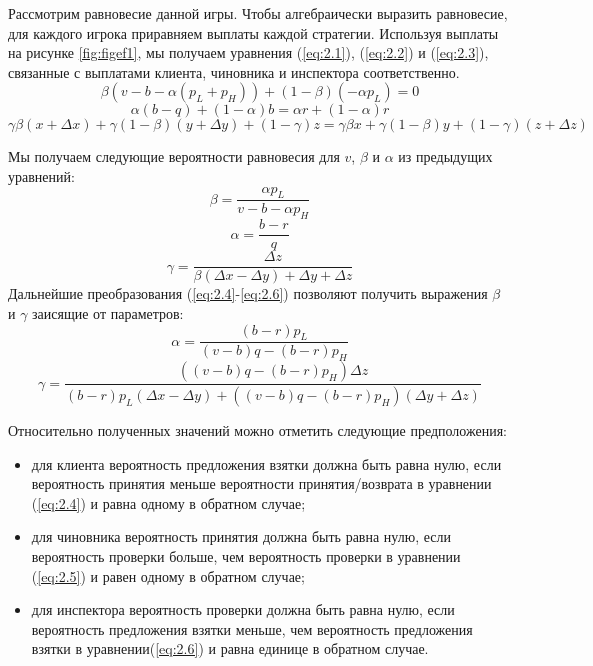 \par
Рассмотрим равновесие данной игры. Чтобы алгебраически выразить равновесие, для каждого игрока приравняем выплаты каждой стратегии. Используя выплаты на рисунке \ref{fig:figef1}, мы получаем уравнения (\ref{eq:2.1}), (\ref{eq:2.2}) и (\ref{eq:2.3}), связанные с выплатами клиента, чиновника и инспектора соответственно.
\begin{equation}\label{eq:2.1}
	\beta(v-b-\alpha(p_L + p_H)) + (1 - \beta)(-\alpha p_L)=0
\end{equation}
\begin{equation}\label{eq:2.2}
	\alpha(b-q) + (1-\alpha)b=\alpha r + (1-\alpha)r
\end{equation}
\begin{equation}\label{eq:2.3}
	\gamma \beta(x+\Delta x) + \gamma(1-\beta)(y+\Delta y) + (1 - \gamma)z = \gamma \beta x + \gamma(1-\beta)y + (1 - \gamma) (z + \Delta z)
\end{equation}
\par
Мы получаем следующие вероятности равновесия для $v$, $\beta$ и $\alpha$ из предыдущих уравнений:
\begin{equation}\label{eq:2.4}
	\beta = \frac{\alpha p_L}{v - b - \alpha p_H}
\end{equation}
\begin{equation}\label{eq:2.5}
	\alpha = \frac{b - r}{q}
\end{equation}
\begin{equation}\label{eq:2.6}
	\gamma = \frac{\Delta z}{\beta (\Delta x - \Delta y) + \Delta y + \Delta z}
\end{equation}
Дальнейшие преобразования (\ref{eq:2.4}-\ref{eq:2.6}) позволяют получить выражения $\beta$ и $\gamma$ заисящие от параметров:
\begin{equation}\label{eq:2.7}
	\alpha = \frac{(b - r)p_L}{(v - b)q - (b - r)p_H}
\end{equation}
\begin{equation}\label{eq:2.8}
	\gamma = \frac{((v-b)q - (b - r)p_H)\Delta z}{(b-r)p_L(\Delta x - \Delta y) + ((v-b)q-(b-r)p_H)(\Delta y + \Delta z)}
\end{equation}
\par
Относительно полученных значений можно отметить следующие предположения:
\begin{itemize}
	\item для клиента вероятность предложения взятки должна быть равна нулю, если вероятность принятия меньше вероятности принятия/возврата в уравнении (\ref{eq:2.4}) и равна одному в обратном случае;
	\item для чиновника вероятность принятия должна быть равна нулю, если вероятность проверки больше, чем вероятность проверки в уравнении (\ref{eq:2.5}) и равен одному в обратном случае;
	\item для инспектора вероятность проверки должна быть равна нулю, если вероятность предложения взятки меньше, чем вероятность предложения взятки в уравнении(\ref{eq:2.6}) и равна единице в обратном случае.
\end{itemize}
